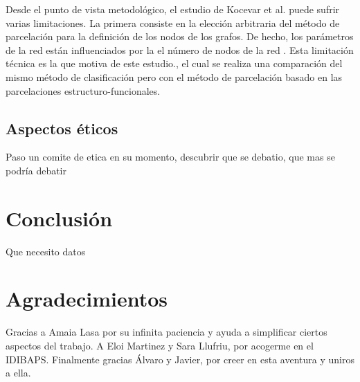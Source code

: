 \documentclass[fleqn,10pt]{UICArticle} %
\begin{document}
Desde el punto de vista metodológico, el estudio de Kocevar et al. \cite{Kocevar2016} puede sufrir varias limitaciones. La primera consiste en la elección arbitraria del método de parcelación para la definición de los nodos de los grafos. De hecho, los parámetros de la red están influenciados por la el número de nodos de la red \cite{Zalesky2010}. Esta limitación técnica es la que motiva  de este estudio., el cual se realiza una comparación del mismo método de clasificación pero con el método de parcelación basado en las parcelaciones estructuro-funcionales.

\subsection{Aspectos éticos}
Paso un comite de etica en su momento, descubrir que se debatio, que mas se podría debatir


\section{Conclusión}

Que necesito datos

\section*{Agradecimientos}
Gracias a Amaia Lasa por su infinita paciencia y ayuda a simplificar ciertos aspectos del trabajo. A Eloi Martinez y Sara Llufriu, por acogerme en el IDIBAPS. Finalmente gracias Álvaro y Javier, por creer en esta aventura y uniros a ella.






\end{document}
